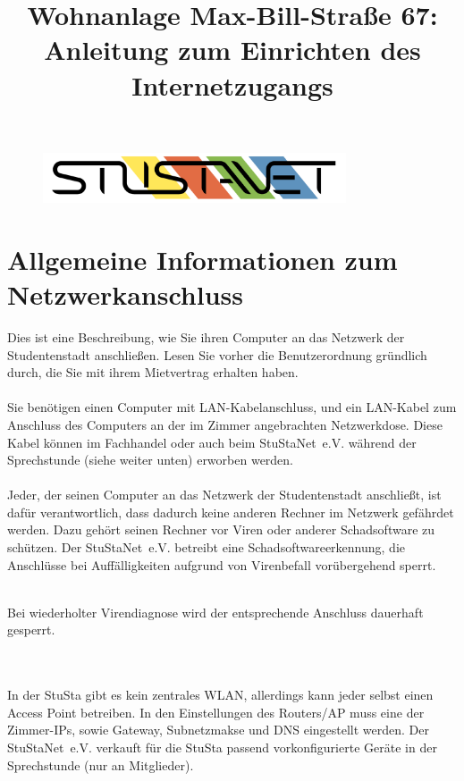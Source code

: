 \documentclass[a4paper,12pt]{scrartcl}
\title{Wohnanlage Max-Bill-Straße 67:\\
       Anleitung zum Einrichten des Internetzugangs}
\begin{document}
\maketitle

\begin{figure}[t!]
   \centering
   \vspace{-20pt}
   \includegraphics[width=0.8\textwidth,keepaspectratio]{Bilder/StuStaNet_Logo}
   \vspace{-40pt}
\end{figure}

\section*{Allgemeine Informationen zum Netzwerkanschluss}

Dies ist eine Beschreibung, wie Sie ihren Computer an das Netzwerk der Studentenstadt anschließen. Lesen Sie vorher die Benutzerordnung gründlich durch, die Sie mit ihrem Mietvertrag erhalten haben.
\\
\\
Sie benötigen einen Computer mit LAN-Kabelanschluss, und ein LAN-Kabel zum Anschluss des Computers an der im Zimmer angebrachten Netzwerkdose. Diese Kabel können im Fachhandel oder auch beim StuStaNet~e.V. während der Sprechstunde (siehe weiter unten) erworben werden.
\\
\\
Jeder, der seinen Computer an das Netzwerk der Studentenstadt anschließt, ist dafür verantwortlich, dass dadurch keine anderen Rechner im Netzwerk gefährdet werden. Dazu gehört seinen Rechner vor Viren oder anderer Schadsoftware zu schützen.
Der StuStaNet~e.V. betreibt eine Schadsoftwareerkennung, die Anschlüsse bei Auffälligkeiten aufgrund von Virenbefall vorübergehend sperrt.
\\
\begin{bfseries}
	\\Bei wiederholter Virendiagnose wird der entsprechende Anschluss dauerhaft gesperrt.
\end{bfseries}
\\
\\
In der StuSta gibt es kein zentrales WLAN, allerdings kann jeder selbst einen Access Point betreiben. In den Einstellungen des Routers/AP muss eine der Zimmer-IPs, sowie Gateway, Subnetzmakse und DNS eingestellt werden. Der StuStaNet~e.V. verkauft für die StuSta passend vorkonfigurierte Geräte in der Sprechstunde (nur an Mitglieder).
\end{document}
